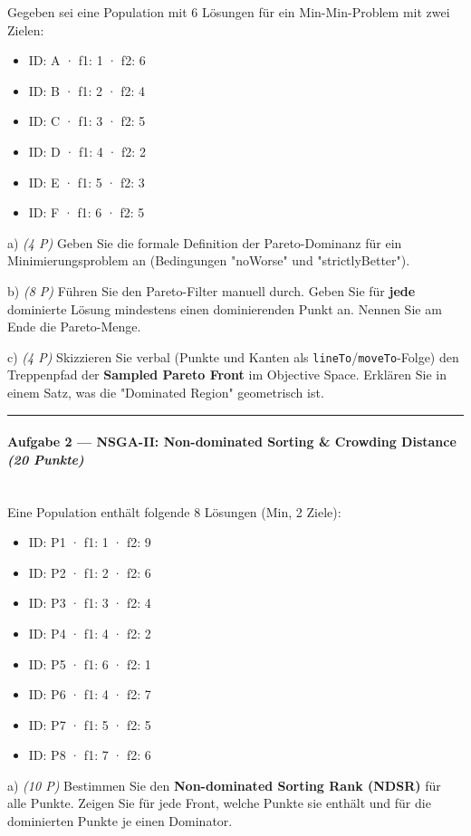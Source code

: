 \documentclass[11pt, a4paper]{article}
\begin{document}
Gegeben sei eine Population mit 6 Lösungen für ein Min-Min-Problem mit zwei Zielen:


\begin{itemize}
  \item ID: A · f1: 1 · f2: 6
  \item ID: B · f1: 2 · f2: 4
  \item ID: C · f1: 3 · f2: 5
  \item ID: D · f1: 4 · f2: 2
  \item ID: E · f1: 5 · f2: 3
  \item ID: F · f1: 6 · f2: 5
\end{itemize}
a) \textit{(4 P)} Geben Sie die formale Definition der Pareto-Dominanz für ein Minimierungsproblem an (Bedingungen "noWorse" und "strictlyBetter").


b) \textit{(8 P)} Führen Sie den Pareto-Filter manuell durch. Geben Sie für \textbf{jede} dominierte Lösung mindestens einen dominierenden Punkt an. Nennen Sie am Ende die Pareto-Menge.


c) \textit{(4 P)} Skizzieren Sie verbal (Punkte und Kanten als \texttt{lineTo}/\texttt{moveTo}-Folge) den Treppenpfad der \textbf{Sampled Pareto Front} im Objective Space. Erklären Sie in einem Satz, was die "Dominated Region" geometrisch ist.



\noindent\textcolor{rulegray}{\rule{\linewidth}{0.4pt}}


\paragraph{Aufgabe 2 — NSGA-II: Non-dominated Sorting \& Crowding Distance \textit{(20 Punkte)}}\mbox{}\\[2pt]

Eine Population enthält folgende 8 Lösungen (Min, 2 Ziele):


\begin{itemize}
  \item ID: P1 · f1: 1 · f2: 9
  \item ID: P2 · f1: 2 · f2: 6
  \item ID: P3 · f1: 3 · f2: 4
  \item ID: P4 · f1: 4 · f2: 2
  \item ID: P5 · f1: 6 · f2: 1
  \item ID: P6 · f1: 4 · f2: 7
  \item ID: P7 · f1: 5 · f2: 5
  \item ID: P8 · f1: 7 · f2: 6
\end{itemize}
a) \textit{(10 P)} Bestimmen Sie den \textbf{Non-dominated Sorting Rank (NDSR)} für alle Punkte. Zeigen Sie für jede Front, welche Punkte sie enthält und für die dominierten Punkte je einen Dominator.
\end{document}
